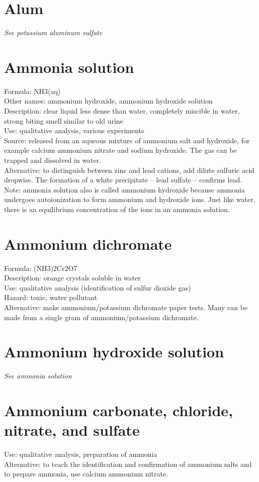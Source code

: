 \section{Alum}
\textit{See potassium aluminum sulfate}

\section{Ammonia solution}
Formula: NH3(aq)\\
Other names: ammonium hydroxide, 
ammonium hydroxide solution\\
Description: clear liquid less dense than water, 
completely miscible in water, 
strong biting smell similar to old urine\\
Use: qualitative analysis, various experiments\\
Source: released from an aqueous mixture of ammonium salt and hydroxide, 
for example calcium ammonium nitrate and sodium hydroxide. 
The gas can be trapped and dissolved in water.\\
Alternative: to distinguish between zinc and lead cations, 
add dilute sulfuric acid dropwise. 
The formation of a white precipitate – lead sulfate – confirms lead.
Note: ammonia solution also is called ammonium hydroxide 
because ammonia undergoes autoionization to form ammonium and hydroxide ions. 
Just like water, 
there is an equilibrium concentration of the ions in an ammonia solution.

\section{Ammonium dichromate}
Formula: (NH3)2Cr2O7\\
Description: orange crystals soluble in water\\
Use: qualitative analysis (identification of sulfur dioxide gas)\\
Hazard: toxic, 
water pollutant\\
Alternative: make ammonium/potassium dichromate paper tests. 
Many can be made from a single gram of ammonium/potassium dichromate.

\section{Ammonium hydroxide solution}
\textit{See ammonia solution}

\section{Ammonium carbonate, chloride, nitrate, and sulfate}
Use: qualitative analysis, 
preparation of ammonia\\
Alternative: to teach the identification 
and confirmation of ammonium salts and to prepare ammonia, 
use calcium ammonium nitrate.


